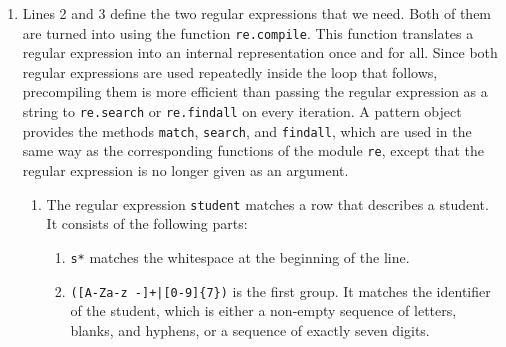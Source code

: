 \begin{enumerate}
\item Lines 2 and 3 define the two regular expressions that we need.  Both of them are turned into
       using the function
      \texttt{re.compile}.  This function translates a regular expression into
      an internal representation once and for all.  Since both regular expressions are used repeatedly inside
      the loop that follows, precompiling them is more efficient than passing the regular expression as a string
      to \texttt{re.search} or \texttt{re.findall} on every iteration.  A pattern object provides the methods
      \texttt{match}, \texttt{search}, and \texttt{findall}, which are used in the same way as the corresponding
      functions of the module \texttt{re}, except that the regular expression is no longer given as an argument.
      \begin{enumerate}
      \item The regular expression \texttt{student} matches a row that describes a student.  It
            consists of the following parts:
            \begin{enumerate}
            \item \texttt{s*} matches the whitespace at the beginning of the line.
            \item \texttt{([A-Za-z -]+|[0-9]\{7\})} is the first group.  It matches the identifier of
                  the student, which is either a non-empty sequence of letters, blanks, and hyphens, or a
                  sequence of exactly seven digits.


\end{enumerate}
\end{enumerate}
\end{enumerate}
